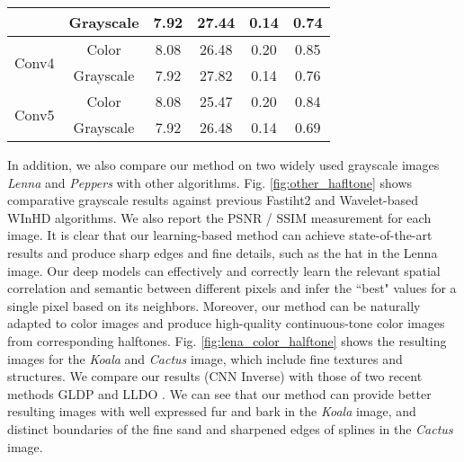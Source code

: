 \documentclass[journal]{IEEEtran}
\begin{document}
\begin{table}[]
\begin{tabular}{c|c|c|c|c|c}
                                                        & Grayscale                                  & 7.92          & 27.44     & 0.14          & 0.74      \\ \hline
\multirow{2}{*}{Conv4}                                  & Color                                      & 8.08          & 26.48     & 0.20          & 0.85      \\ \cline{2-6}
                                                        & Grayscale                                  & 7.92          & 27.82     & 0.14          & 0.76      \\ \hline
\multirow{2}{*}{Conv5}                                  & Color                                      & 8.08          & 25.47     & 0.20          & 0.84      \\ \cline{2-6}
                                                        & Grayscale                                  & 7.92          & 26.48     & 0.14          & 0.69      \\ \hline
\end{tabular}
\end{table}



In addition, we also compare our method on two widely used grayscale images \textit{Lenna} and \textit{Peppers} with other algorithms. Fig. \ref{fig:other_hafltone} shows comparative grayscale results against previous Fastiht2 \cite{kite2000fast} and Wavelet-based WInHD \cite{neelamani2002winhd} algorithms. We also report the PSNR / SSIM measurement for each image. It is clear that our learning-based method can achieve state-of-the-art results and produce sharp edges and fine details, such as the hat in the Lenna image. Our deep models can effectively and correctly learn the relevant spatial correlation and semantic between different pixels and infer the ``best" values for a single pixel based on its neighbors. Moreover, our method can be naturally adapted to color images and produce high-quality continuous-tone color images from corresponding halftones. Fig. \ref{fig:lena_color_halftone} shows the resulting images for the \textit{Koala} and \textit{Cactus} image, which include fine textures and structures. We compare our results (CNN Inverse) with those of two recent methods GLDP \cite{son2012inverse} and LLDO \cite{son2014local}. We can see that our method can provide better resulting images with well expressed fur and bark in the \textit{Koala} image, and distinct boundaries of the fine sand and sharpened edges of splines in the \textit{Cactus} image.
\end{document}
